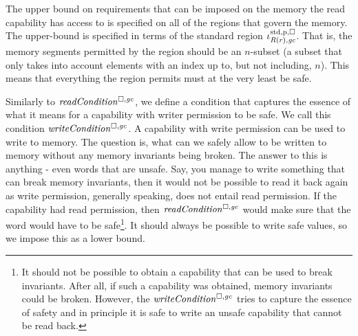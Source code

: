 \begin{jversion}
The upper bound on requirements that can be imposed on the memory the read capability has access to is specified on all of the regions that govern the memory.
The upper-bound is specified in terms of the standard region $\iota^{\mathrm{std},\mathrm{p},\square}_{R(r),\mathit{gc}}$.
That is, the memory segments permitted by the region should be an $n$-subset (a subset that only takes into account elements with an index up to, but not including, $n$).
This means that everything the region permits must at the very least be safe.


Similarly to $\readCond{}$, we define a condition that captures the essence of what it means for a capability with writer permission to be safe.
We call this condition $\writeCond{}$.
A capability with write permission can be used to write to memory.
The question is, what can we safely allow to be written to memory without any memory invariants being broken.
The answer to this is anything - even words that are unsafe.
Say, you manage to write something that can break memory invariants, then it would not be possible to read it back again as write permission, generally speaking, does not entail read permission.
If the capability had read permission, then $\readCond{}$ would make sure that the word would have to be safe\footnote{It should not be possible to obtain a capability that can be used to break invariants. After all, if such a capability was obtained, memory invariants could be broken.
  However, the $\writeCond{}$ tries to capture the essence of safety and in principle it is safe to write an unsafe capability that cannot be read back.}.
It should always be possible to write safe values, so we impose this as a lower bound.


\end{jversion}

